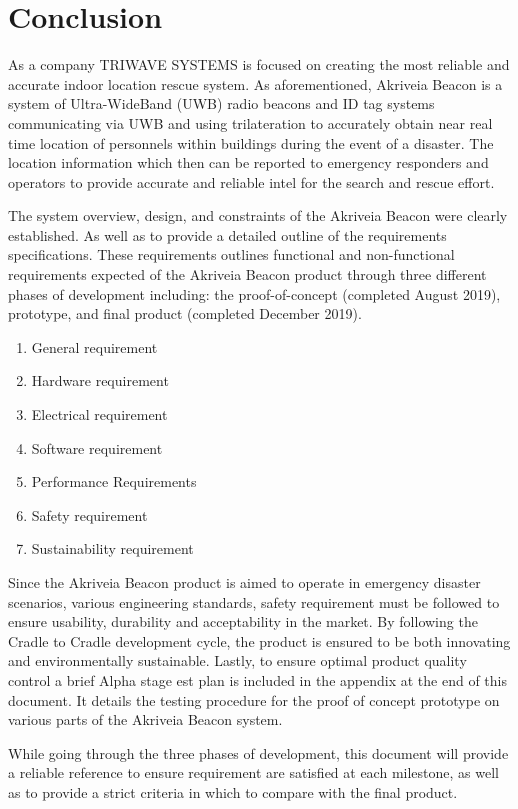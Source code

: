 

\setcounter{section}{5}
\section{Conclusion}
\bigskip
As a company TRIWAVE SYSTEMS is focused on creating the most reliable and accurate indoor location rescue system. As aforementioned, Akriveia Beacon is a system of Ultra-WideBand (UWB) radio beacons and ID tag systems communicating via UWB and using trilateration to accurately obtain near real time location of personnels within buildings during the event of a disaster. The location information which then can be reported to emergency responders and operators to provide accurate and reliable intel for the search and rescue effort. 

\bigskip
The system overview, design, and constraints of the Akriveia Beacon were clearly established. As well as to provide a detailed outline of the requirements specifications. These requirements outlines functional and non-functional requirements expected of the Akriveia Beacon product through three different phases of development including: the proof-of-concept (completed August 2019), prototype, and final product (completed December 2019).

\begin{enumerate}
	\item General requirement 
	\item Hardware requirement 
	\item Electrical requirement 
	\item Software requirement 
	\item Performance Requirements
	\item Safety requirement 
	\item Sustainability  requirement 
\end{enumerate}


Since the Akriveia Beacon product is aimed to operate in emergency disaster scenarios, various engineering standards, safety requirement must be followed to ensure usability, durability and acceptability in the market. By following the Cradle to Cradle development cycle, the product is ensured to be both innovating and environmentally sustainable. Lastly, to ensure optimal product quality control a brief Alpha stage est plan is included in the appendix at the end of this document. It details the testing procedure for the proof of concept prototype on various parts of the Akriveia Beacon system.

\bigskip
While going through the three phases of development, this document will provide a reliable
reference to ensure requirement are satisfied at each milestone, as well as to provide a strict criteria in which to compare with the final product.

%